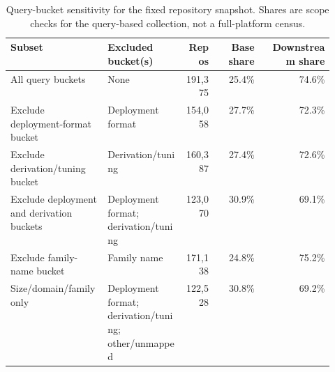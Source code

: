 \begin{table}[t]
\centering
\caption{Query-bucket sensitivity for the fixed repository snapshot. Shares are scope checks for the query-based collection, not a full-platform census.}
\label{tab:query-sensitivity}
\small
\begin{tabular}{p{0.30\linewidth}p{0.24\linewidth}r r r}
\toprule
Subset & Excluded bucket(s) & Repos & Base share & Downstream share \\
\midrule
All query buckets & None & 191,375 & 25.4\% & 74.6\% \\
Exclude deployment-format bucket & Deployment format & 154,058 & 27.7\% & 72.3\% \\
Exclude derivation/tuning bucket & Derivation/tuning & 160,387 & 27.4\% & 72.6\% \\
Exclude deployment and derivation buckets & Deployment format; derivation/tuning & 123,070 & 30.9\% & 69.1\% \\
Exclude family-name bucket & Family name & 171,138 & 24.8\% & 75.2\% \\
Size/domain/family only & Deployment format; derivation/tuning; other/unmapped & 122,528 & 30.8\% & 69.2\% \\
\bottomrule
\end{tabular}
\end{table}
